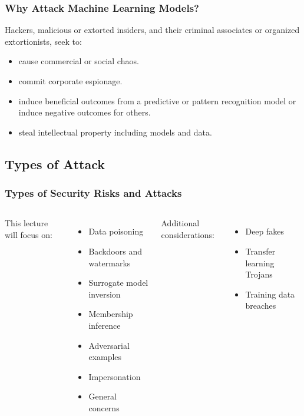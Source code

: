 \documentclass[11pt,
               aspectratio=169,
               hyperref={colorlinks}
               ]{beamer}
\begin{document}
		\begin{frame}
		
			\frametitle{Why Attack Machine Learning Models?}
Hackers, malicious or extorted insiders, and their criminal associates or organized extortionists, seek to:
				\begin{itemize}
					\item cause commercial or social chaos.
					\item commit corporate espionage.
					\item induce beneficial outcomes from a predictive or pattern recognition model or induce negative outcomes for others. %
					\item steal intellectual property including models and data.
				\end{itemize}	
			\end{frame}


		\subsection{Types of Attack} %
			
		\begin{frame}
		
			\frametitle{Types of Security Risks and Attacks}
			
		
				\begin{columns}[t]

					This lecture will focus on:
					\begin{itemize}
						\item Data poisoning
						\item Backdoors and watermarks
						\item Surrogate model inversion
						\item Membership inference
						\item Adversarial examples
						\item Impersonation 
						\item General concerns						
					\end{itemize}	

					Additional considerations:
					\begin{itemize}
						\item Deep fakes
						\item Transfer learning Trojans	
						\item Training data breaches				
					\end{itemize}

				\end{columns}


		
					
		\end{frame}	
\end{document}
